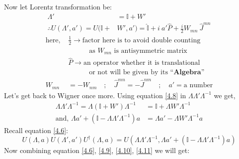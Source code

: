 \documentclass[14pt]{article} %
\begin{document}
Now let Lorentz transformation be:
\begin{align*}
\Lambda' &= \mathbb{I}+W' \tag{4.8} \label{4.8} \\
\therefore U(\Lambda',a') = U(\mathbb{I}+& W',a') = \hat{\mathbb{I}} + i~a'\hat{P} + \frac{i}{2} W_{mn}~ \hat{J}^{mn} \tag{4.9} \label{4.9}
\end{align*}
\begin{align*}
\text{here, }&\frac{1}{2} \rightarrow\text{factor here is to avoid double counting}\\
&\quad \quad \quad \text{as } W_{mn} \text{ is antisymmetric matrix}\\
&\hat{P} \rightarrow \text{an operator whether it is translational}\\ &\quad \quad \quad\text{or not will be given by its } \textbf{``Algebra''} \\
W_{mn} &= -W_{nm} \quad;\quad \hat{J}^{mn} = -\hat{J}^{nm} \quad;\quad a' = \text{a number}
\end{align*}
Let's get back to Wigner once more. Using equation \eqref{4.8} in $\Lambda \Lambda' \Lambda^{-1}$ we get,
\begin{align*}
\Lambda \Lambda' \Lambda^{-1} = \Lambda (\mathbb{I}+W')\Lambda^{-1} &=\mathbb{I} + \Lambda W' \Lambda^{-1} \tag{4.10} \label{4.10}\\
\text{and, } \Lambda a'+(\mathbb{I}-\Lambda \Lambda' \Lambda^{-1})a &= \Lambda a' - \Lambda W' \Lambda^{-1}a \tag{4.11} \label{4.11}
\end{align*}
Recall equation \eqref{4.6}:
\[
U(\Lambda, a) U(\Lambda', a') U^\dagger(\Lambda, a) = U(\Lambda \Lambda' \Lambda^{-1}, \Lambda a' + (\mathbb{I} - \Lambda \Lambda' \Lambda^{-1}) a) \tag{4.6} \label{4.6}
\]
Now combining equation \eqref{4.6}, \eqref{4.9}, \eqref{4.10}, \eqref{4.11} we will get:
\end{document}
